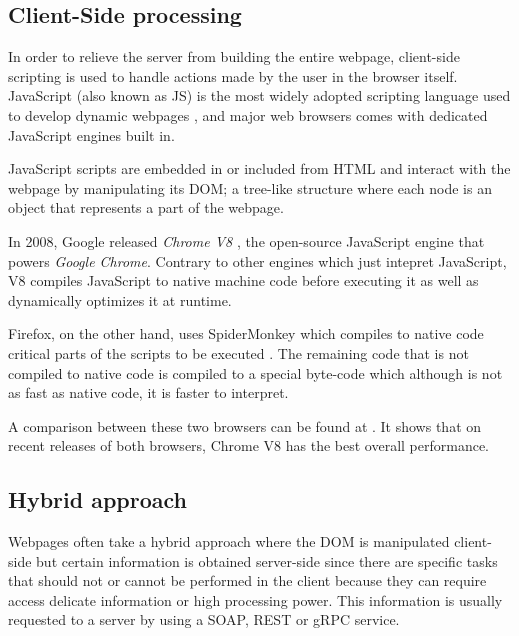 \subsection{Client-Side processing}
In order to relieve the server from building the entire webpage, client-side scripting is used to handle actions made by the user in the browser itself. JavaScript (also known as JS) is the most widely adopted scripting language used to develop dynamic webpages \cite{js_stats}, and major web browsers comes with dedicated JavaScript engines built in.  

JavaScript scripts are embedded in or included from HTML and interact with the webpage by manipulating its DOM; a tree-like structure where each node is an object that represents a part of the webpage. 

In 2008, Google released \textit{Chrome V8} \cite{chrome_v8}, the open-source JavaScript engine that powers \textit{Google Chrome}. Contrary to other engines which just intepret JavaScript, V8 compiles JavaScript to native machine code before executing it as well as dynamically optimizes it at runtime.

Firefox, on the other hand, uses SpiderMonkey which compiles to native code critical parts of the scripts to be executed \cite{tampermoneky}. The remaining code that is not compiled to native code is compiled to a special byte-code which although is not as fast as native code, it is faster to interpret.

A comparison between these two browsers can be found at \cite{firefox_benchmark}. It shows that on recent releases of both browsers, Chrome V8 has the best overall performance.

\subsection{Hybrid approach}
Webpages often take a hybrid approach where the DOM is manipulated client-side but certain information is obtained server-side since there are specific tasks that should not or cannot be performed in the client because they can require access delicate information or high processing power. This information is usually requested to a server by using a SOAP, REST or gRPC service.

